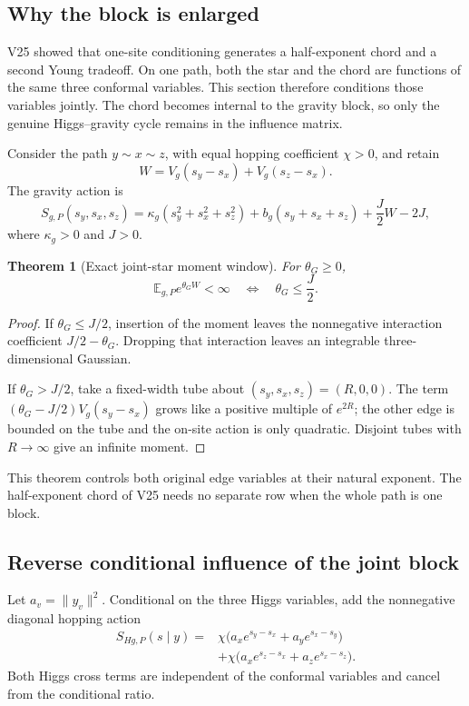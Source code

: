 \documentclass[11pt]{article}
\newtheorem{theorem}{Theorem}[section]
\theoremstyle{remark}
\begin{document}
\subsection{Why the block is enlarged}

V25 showed that one-site conditioning generates a half-exponent chord
and a second Young tradeoff.  On one path, both the star and the chord
are functions of the same three conformal variables.  This section
therefore conditions those variables jointly.  The chord becomes
internal to the gravity block, so only the genuine Higgs--gravity cycle
remains in the influence matrix.

Consider the path \(y\sim x\sim z\), with equal hopping coefficient
\(\chi>0\), and retain
\[
 W=V_g(s_y-s_x)+V_g(s_z-s_x).                      \tag{26.1}
\]
The gravity action is
\[
 S_{g,P}(s_y,s_x,s_z)
 =\kappa_g(s_y^2+s_x^2+s_z^2)
 +b_g(s_y+s_x+s_z)+\frac J2W-2J,                  \tag{26.2}
\]
where \(\kappa_g>0\) and \(J>0\).

\begin{theorem}[Exact joint-star moment window]
\label{thm:v17v26-star-window}
For \(\theta_G\geq0\),
\[
 \mathbb E_{g,P}e^{\theta_GW}<\infty
 \quad\Longleftrightarrow\quad
 \theta_G\leq\frac J2.                            \tag{26.3}
\]
\end{theorem}

\begin{proof}
If \(\theta_G\leq J/2\), insertion of the moment leaves the
nonnegative interaction coefficient \(J/2-\theta_G\).  Dropping that
interaction leaves an integrable three-dimensional Gaussian.

If \(\theta_G>J/2\), take a fixed-width tube about
\((s_y,s_x,s_z)=(R,0,0)\).  The term
\((\theta_G-J/2)V_g(s_y-s_x)\) grows like a positive multiple of
\(e^{2R}\); the other edge is bounded on the tube and the on-site action
is only quadratic.  Disjoint tubes with \(R\to\infty\) give an infinite
moment.
\end{proof}

This theorem controls both original edge variables at their natural
exponent.  The half-exponent chord of V25 needs no separate row when the
whole path is one block.

\subsection{Reverse conditional influence of the joint block}

Let \(a_v=\|y_v\|^2\).  Conditional on the three Higgs variables, add
the nonnegative diagonal hopping action
\[
\begin{aligned}
 S_{H\!g,P}(s\mid y)={}&\chi
 \bigl(a_xe^{s_y-s_x}+a_ye^{s_x-s_y}\bigr)\\
 &+\chi\bigl(a_xe^{s_z-s_x}+a_ze^{s_x-s_z}\bigr).
                                                               \tag{26.4}
\end{aligned}
\]
Both Higgs cross terms are independent of the conformal variables and
cancel from the conditional ratio.
\end{document}
